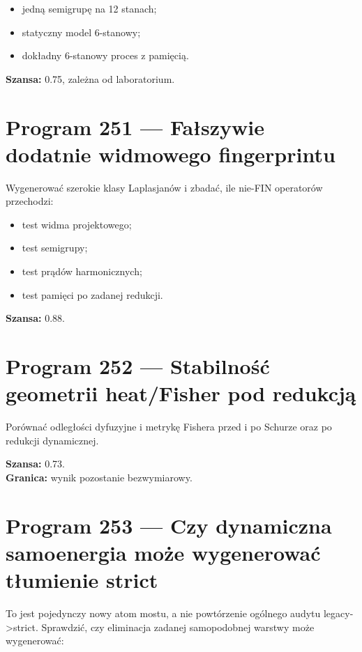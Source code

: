 \documentclass[11pt,a4paper,openany]{report}
\begin{document}
\begin{itemize}
\item 
jedną semigrupę na 12 stanach;

\item 
statyczny model 6-stanowy;

\item 
dokładny 6-stanowy proces z pamięcią.

\end{itemize}

\textbf{Szansa:} 0.75, zale\.zna od laboratorium.

\section{Program 251 --- Fałszywie dodatnie widmowego fingerprintu}

Wygenerować szerokie klasy Laplasjanów i zbadać, ile nie-FIN operatorów przechodzi:

\begin{itemize}
\item 
test widma projektowego;

\item 
test semigrupy;

\item 
test prądów harmonicznych;

\item 
test pamięci po zadanej redukcji.

\end{itemize}

\textbf{Szansa:} 0.88.

\section{Program 252 --- Stabilność geometrii heat/\allowbreak{}Fisher pod redukcją}

Porównać odległości dyfuzyjne i metrykę Fishera przed i po Schurze oraz po redukcji dynamicznej.

\textbf{Szansa:} 0.73.\\
\textbf{Granica:} wynik pozostanie bezwymiarowy.

\section{Program 253 --- Czy dynamiczna samoenergia mo\.ze wygenerować tłumienie strict}

To jest pojedynczy nowy atom mostu, a nie powtórzenie ogólnego audytu legacy->strict. Sprawdzić, czy eliminacja zadanej samopodobnej warstwy mo\.ze wygenerować:
\end{document}
